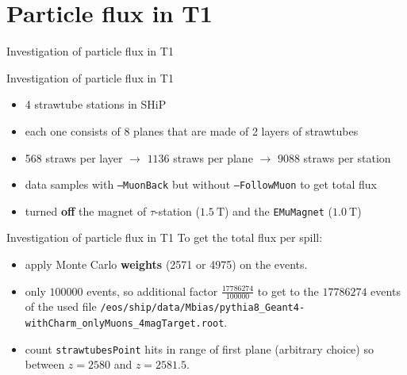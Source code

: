 \section{Particle flux in T1}

\begin{frame}[t]
  \vspace*{\fill}
    \centering
    {\huge Investigation of particle flux in T1}
  \vspace*{\fill}
\end{frame}

\begin{frame}[t]{Investigation of particle flux in T1}
  \vspace*{\fill}
    \begin{itemize}
      \item 4 strawtube stations in SHiP
      \item each one consists of 8 planes that are made of 2 layers of strawtubes
      \item 568 straws per layer $\rightarrow$ $\num{1136}$ straws per plane $\rightarrow$ $\num{9088}$ straws per station
      \item data samples with \texttt{--MuonBack} but without \texttt{--FollowMuon} to get total flux
      \item turned \textbf{off} the magnet of $\tau$-station ($\SI{1.5}{\tesla}$) and the \texttt{EMuMagnet} ($\SI{1.0}{\tesla}$)
    \end{itemize}
  \vspace*{\fill}
\end{frame}
\begin{frame}[t]{Investigation of particle flux in T1}
  \vspace*{\fill}
    To get the total flux per spill:
    \begin{itemize}
      \item apply Monte Carlo \textbf{weights} (\num{2571} or \num{4975}) on the events.
      \item only $\num{100000}$ events, so additional factor $\frac{\num{17786274}}{\num{100000}}$ to get to the $\num{17786274}$ events of the used file \texttt{/eos/ship/data/Mbias/pythia8\_Geant4-withCharm\_onlyMuons\_4magTarget.root}.
      \item count \texttt{strawtubesPoint} hits in range of first plane (arbitrary choice) so between $z=2580$ and $z=2581.5$.
    \end{itemize}
  \vspace*{\fill}
\end{frame}

